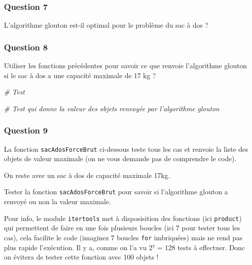 \documentclass[
  paper=a4,
  ,captions=tableheading
]{scrartcl}
\newenvironment{Shaded}{}{}
\newcommand{\CommentTok}[1]{\textcolor[rgb]{0.38,0.63,0.69}{\textit{#1}}}
\begin{document}
\hypertarget{question-7}{%
\subsubsection{Question 7}\label{question-7}}

L'algorithme glouton est-il optimal pour le problème du sac à dos ?

\hypertarget{question-8}{%
\subsubsection{Question 8}\label{question-8}}

Utiliser les fonctions précédentes pour savoir ce que renvoie
l'algorithme glouton si le sac à dos a une capacité maximale de 17 kg ?

\begin{Shaded}
\begin{Highlighting}[]
\CommentTok{\# Test}
\end{Highlighting}
\end{Shaded}

\begin{Shaded}
\begin{Highlighting}[]
\CommentTok{\# Test qui donne la valeur des objets renvoyée par l’algorithme glouton}
\end{Highlighting}
\end{Shaded}

\hypertarget{question-9}{%
\subsubsection{Question 9}\label{question-9}}

La fonction \texttt{sacAdosForceBrut} ci-dessous teste tous les cas et
renvoie la liste des objets de valeur maximale (on ne vous demande pas
de comprendre le code).

On reste avec un sac à dos de capacité maximale 17kg.

Tester la fonction \texttt{sacAdosForceBrut} pour savoir si l'algorithme
glouton a renvoyé ou non la valeur maximale.

Pour info, le module \texttt{itertools} met à disposisition des
fonctions (ici \texttt{product}) qui permettent de faire en une fois
plusieurs boucles (ici 7 pour tester tous les cas), cela facilite le
code (imaginez 7 boucles \texttt{for} imbriquées) mais ne rend pas plus
rapide l'exécution. Il y a, comme on l'a vu 2⁷ = 128 tests à effectuer.
Donc on évitera de tester cette fonction avec 100 objets !
\end{document}
